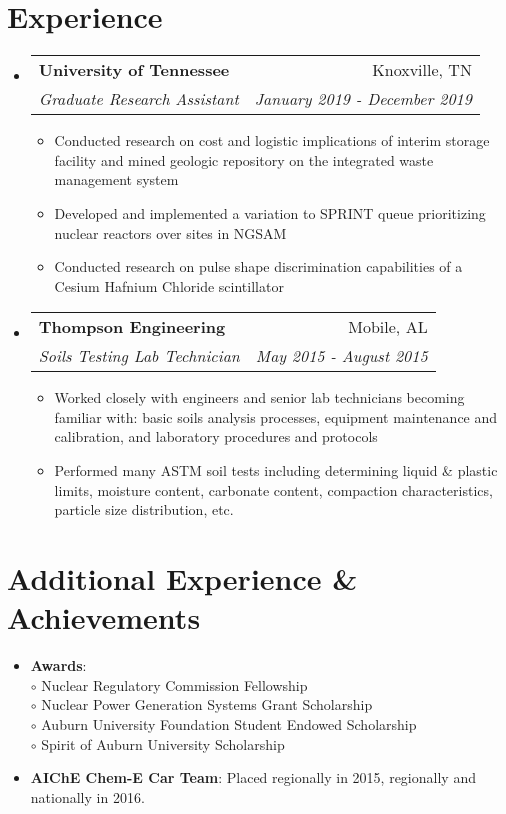 \documentclass[letterpaper,10pt]{article}
\makeatletter
\newcommand{\resumeSubheading}[4]{
  \vspace{-1pt}\item[]
  \begin{tabular*}{0.98\textwidth}{l@{\extracolsep{\fill}}r}
      \hspace{-10pt}\textbf{#1} & #2 \\
      \hspace{-10pt}\textit{\small#3} & \textit{\small #4} \\
    \end{tabular*}\vspace{-5pt}
}
\newcommand{\resumeSubHeadingListStart}{\begin{itemize}[leftmargin=*]}
\newcommand{\resumeSubHeadingListEnd}{\end{itemize}}
\newcommand{\resumeItemListStart}{\begin{itemize}}
\newcommand{\resumeItemListEnd}{\end{itemize}\vspace{-5pt}}
\newcommand{\shorterSection}[1]{\vspace{-10pt}\section{#1}}
\makeatother
\begin{document}
\shorterSection{Experience}
  \resumeSubHeadingListStart
    \resumeSubheading
      {University of Tennessee}{Knoxville, TN}
      {Graduate Research Assistant}{January 2019 - December 2019}
      \resumeItemListStart
        \small
        \item{
            Conducted research on cost and logistic implications of interim storage facility and mined geologic repository on the integrated waste management system
        }
        \item{ 
            Developed and implemented a variation to SPRINT queue prioritizing nuclear reactors over sites in NGSAM
        }
        \item{
            Conducted research on pulse shape discrimination capabilities of a Cesium Hafnium Chloride scintillator
        }
      \resumeItemListEnd
    \resumeSubheading
      {Thompson Engineering}{Mobile, AL}
      {Soils Testing Lab Technician}{May 2015 - August 2015}
      \resumeItemListStart
        \small
        \item{
            Worked closely with engineers and senior lab technicians becoming familiar with: basic soils analysis processes, equipment maintenance and calibration, and laboratory procedures and protocols
        }
        \item{
            Performed many ASTM soil tests including determining liquid \& plastic limits, moisture content, carbonate content, compaction characteristics, particle size distribution, etc.
        }
      \resumeItemListEnd

  \resumeSubHeadingListEnd



\shorterSection{Additional Experience \& Achievements}
  \resumeSubHeadingListStart
  \small
    \item{\textbf{Awards}:\\ 
    \hspace{13pt}$\circ$ Nuclear Regulatory Commission Fellowship\\
    \hspace{13pt}$\circ$ Nuclear Power Generation Systems Grant Scholarship\\
    \hspace{13pt}$\circ$ Auburn University Foundation Student Endowed Scholarship\\
    \hspace{13pt}$\circ$ Spirit of Auburn University Scholarship}
    \item{\textbf{AIChE Chem-E Car Team}: Placed  regionally in 2015,  regionally and  nationally in 2016.}
  \resumeSubHeadingListEnd
\end{document}
